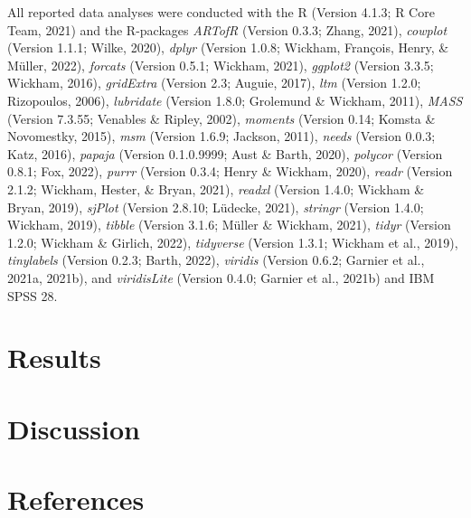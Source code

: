 \documentclass[
  man,floatsintext]{apa6}
\begin{document}
All reported data analyses were conducted with the R (Version 4.1.3; R Core Team, 2021) and the R-packages \emph{ARTofR} (Version 0.3.3; Zhang, 2021), \emph{cowplot} (Version 1.1.1; Wilke, 2020), \emph{dplyr} (Version 1.0.8; Wickham, François, Henry, \& Müller, 2022), \emph{forcats} (Version 0.5.1; Wickham, 2021), \emph{ggplot2} (Version 3.3.5; Wickham, 2016), \emph{gridExtra} (Version 2.3; Auguie, 2017), \emph{ltm} (Version 1.2.0; Rizopoulos, 2006), \emph{lubridate} (Version 1.8.0; Grolemund \& Wickham, 2011), \emph{MASS} (Version 7.3.55; Venables \& Ripley, 2002), \emph{moments} (Version 0.14; Komsta \& Novomestky, 2015), \emph{msm} (Version 1.6.9; Jackson, 2011), \emph{needs} (Version 0.0.3; Katz, 2016), \emph{papaja} (Version 0.1.0.9999; Aust \& Barth, 2020), \emph{polycor} (Version 0.8.1; Fox, 2022), \emph{purrr} (Version 0.3.4; Henry \& Wickham, 2020), \emph{readr} (Version 2.1.2; Wickham, Hester, \& Bryan, 2021), \emph{readxl} (Version 1.4.0; Wickham \& Bryan, 2019), \emph{sjPlot} (Version 2.8.10; Lüdecke, 2021), \emph{stringr} (Version 1.4.0; Wickham, 2019), \emph{tibble} (Version 3.1.6; Müller \& Wickham, 2021), \emph{tidyr} (Version 1.2.0; Wickham \& Girlich, 2022), \emph{tidyverse} (Version 1.3.1; Wickham et al., 2019), \emph{tinylabels} (Version 0.2.3; Barth, 2022), \emph{viridis} (Version 0.6.2; Garnier et al., 2021a, 2021b), and \emph{viridisLite} (Version 0.4.0; Garnier et al., 2021b) and IBM SPSS 28.

\hypertarget{results}{%
\section{Results}\label{results}}

\hypertarget{discussion}{%
\section{Discussion}\label{discussion}}

\newpage

\hypertarget{references}{%
\section{References}\label{references}}

\begingroup
\setlength{\parindent}{-0.5in}
\setlength{\leftskip}{0.5in}
\end{document}
